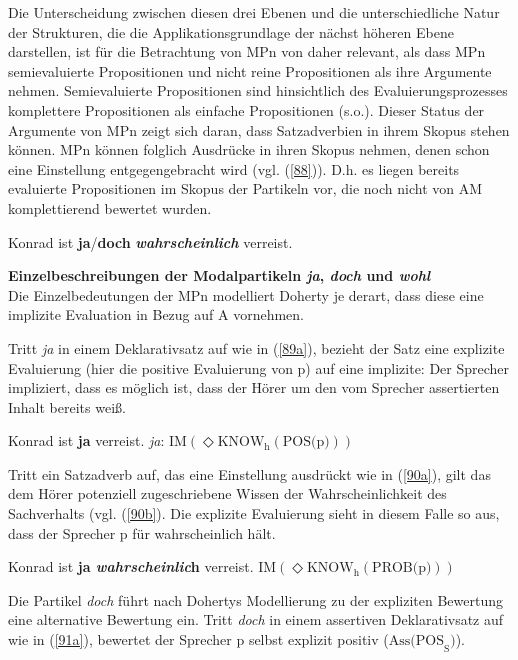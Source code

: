 Die Unterscheidung zwischen diesen drei Ebenen und die unterschiedliche Natur der Strukturen, die die Applikationsgrundlage der nächst höheren Ebene darstellen, ist für die Betrachtung von MPn von daher relevant, als dass MPn semievaluierte Propositionen und nicht \glq reine\grq {} Propositionen als ihre Argumente nehmen. Semievaluierte Propositionen sind hinsichtlich des Evaluierungsprozes\-ses \glq komplettere\grq {} Propositionen als \glq einfache\grq {} Propositionen (s.o.). Dieser Status der Argumente von MPn zeigt sich daran, dass Satzadverbien in ihrem Skopus stehen können. MPn können folglich Ausdrücke in ihren Skopus nehmen, denen schon eine Einstellung entgegengebracht wird (vgl. (\ref{88})). D.h. es liegen bereits evaluierte Propositionen im Skopus der Partikeln vor, die noch nicht von AM komplettierend bewertet wurden.

\begin{exe}
	\ex\label{88} 
	Konrad ist \textbf{ja}/\textbf{doch} \textbf{\textit{wahrscheinlich}} verreist.
\end{exe}
\noindent
\textbf{Einzelbeschreibungen der Modalpartikeln \textit{ja}, \textit{doch} und \textit{wohl}}\\
Die Einzelbedeutungen der MPn modelliert Doherty je derart, dass diese eine implizite Evaluation in Bezug auf A vornehmen.

Tritt \textit{ja} in einem Deklarativsatz  auf wie in (\ref{89a}), bezieht der Satz eine explizite Evaluierung (hier die positive Evaluierung von p) auf eine implizite: Der Sprecher impliziert, dass es möglich ist, dass der Hörer um den vom Sprecher assertierten Inhalt bereits weiß.

\begin{exe}
	\ex\label{89} 
		\begin{xlist}	
			\ex\label{89a} Konrad ist \textbf{ja} verreist.	
			\ex\label{89b} \textit{ja}:	$\textrm{IM}(\Diamond \textrm{KNOW}_{\textrm{h}}(\textrm{POS(p)}))$	
			\hfill\hbox {\citet[101]{Doherty1987}}
		\end{xlist}
\end{exe}
Tritt ein Satzadverb  auf, das eine Einstellung ausdrückt wie in (\ref{90a}), gilt das dem Hörer potenziell zugeschriebene Wissen der Wahrscheinlichkeit des Sachverhalts (vgl. (\ref{90b}). Die explizite Evaluierung sieht in diesem Falle so aus, dass der Sprecher p für wahrscheinlich hält.

\begin{exe}
	\ex\label{90} 
		\begin{xlist}	
			\ex\label{90a} Konrad ist \textbf{ja \textit{wahrscheinlic}h} verreist.	
			\ex\label{90b} $\textrm{IM}(\Diamond \textrm{KNOW}_{\textrm{h}}(\textrm{PROB(p)}))$
			\hfill\hbox {\citet[101]{Doherty1987}}
		\end{xlist}
\end{exe}
Die Partikel \textit{doch} führt nach Dohertys Modellierung zu der expliziten Bewertung eine alternative Bewertung ein. Tritt \textit{doch} in einem assertiven Deklarativsatz  auf wie in (\ref{91a}), bewertet der Sprecher p selbst explizit positiv ($\textrm{Ass(POS}_{\textrm{S}})$). 

